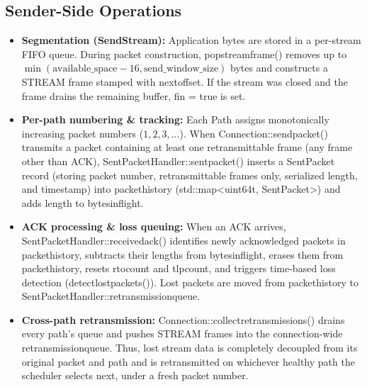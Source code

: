 \documentclass[10pt,a4paper]{article}
\newcommand{\codeul}{\textunderscore\hspace{0pt}}
\DeclareRobustCommand{\code}[1]{{\ttfamily\let\_\codeul #1}}
\begin{document}
\subsection{Sender-Side Operations}
\begin{itemize}
    \item \textbf{Segmentation (\code{SendStream}):} Application bytes are stored in a per-stream FIFO queue. During packet construction, \code{pop\_stream\_frame()} removes up to $\min(\text{available\_space} - 16, \text{send\_window\_size})$ bytes and constructs a \code{STREAM} frame stamped with \code{next\_offset}. If the stream was closed and the frame drains the remaining buffer, \code{fin = true} is set.
    \item \textbf{Per-path numbering \& tracking:} Each \code{Path} assigns monotonically increasing packet numbers ($1, 2, 3, \dots$). When \code{Connection::send\_packet()} transmits a packet containing at least one retransmittable frame (any frame other than \code{ACK}), \code{SentPacketHandler::sent\_packet()} inserts a \code{SentPacket} record (storing packet number, retransmittable frames only, serialized length, and timestamp) into \code{packet\_history} (\code{std::map<uint64\_t, SentPacket>}) and adds \code{length} to \code{bytes\_in\_flight}.
    \item \textbf{ACK processing \& loss queuing:} When an ACK arrives, \code{SentPacketHandler::received\_ack()} identifies newly acknowledged packets in \code{packet\_history}, subtracts their lengths from \code{bytes\_in\_flight}, erases them from \code{packet\_history}, resets \code{rto\_count} and \code{tlp\_count}, and triggers time-based loss detection (\code{detect\_lost\_packets()}). Lost packets are moved from \code{packet\_history} to \code{SentPacketHandler::retransmission\_queue}.
    \item \textbf{Cross-path retransmission:} \code{Connection::\hspace{0pt}collect\_retransmissions()} drains every path's queue and pushes \code{STREAM} frames into the connection-wide \code{retransmission\_queue}. Thus, lost stream data is completely decoupled from its original packet and path and is retransmitted on whichever healthy path the scheduler selects next, under a fresh packet number.
\end{itemize}
\end{document}
